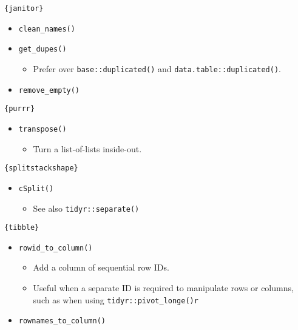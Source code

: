 \documentclass[
]{book}
\providecommand{\tightlist}{%
  \setlength{\itemsep}{0pt}\setlength{\parskip}{0pt}}
\begin{document}
\texttt{\{janitor\}}

\begin{itemize}
\tightlist
\item
  \texttt{clean\_names()}
\item
  \texttt{get\_dupes()}

  \begin{itemize}
  \tightlist
  \item
    Prefer over \texttt{base::duplicated()} and \texttt{data.table::duplicated()}.
  \end{itemize}
\item
  \texttt{remove\_empty()}
\end{itemize}

\texttt{\{purrr\}}

\begin{itemize}
\tightlist
\item
  \texttt{transpose()}

  \begin{itemize}
  \tightlist
  \item
    Turn a list-of-lists inside-out.
  \end{itemize}
\end{itemize}

\texttt{\{splitstackshape\}}

\begin{itemize}
\tightlist
\item
  \texttt{cSplit()}

  \begin{itemize}
  \tightlist
  \item
    See also \texttt{tidyr::separate()}
  \end{itemize}
\end{itemize}

\texttt{\{tibble\}}

\begin{itemize}
\tightlist
\item
  \texttt{rowid\_to\_column()}

  \begin{itemize}
  \tightlist
  \item
    Add a column of sequential row IDs.
  \item
    Useful when a separate ID is required to manipulate rows or columns, such as when using \texttt{tidyr::pivot\_longe()r}
  \end{itemize}
\item
  \texttt{rownames\_to\_column()}
\end{itemize}
\end{document}
